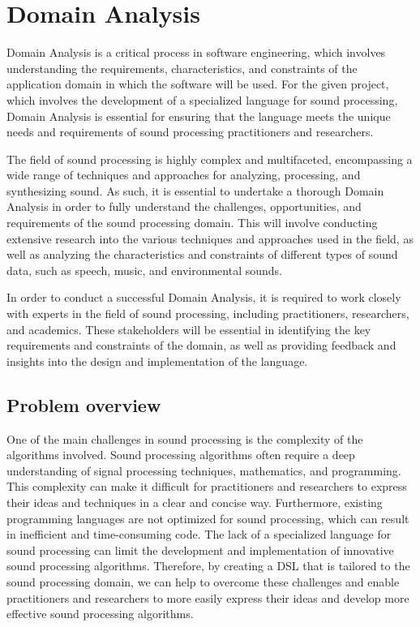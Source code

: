 \chapter{Domain Analysis}

Domain Analysis is a critical process in software engineering, which involves understanding the requirements, characteristics, and constraints of the application domain in which the software will be used. For the given project, which involves the development of a specialized language for sound processing, Domain Analysis is essential for ensuring that the language meets the unique needs and requirements of sound processing practitioners and researchers.

The field of sound processing is highly complex and multifaceted, encompassing a wide range of techniques and approaches for analyzing, processing, and synthesizing sound. As such, it is essential to undertake a thorough Domain Analysis in order to fully understand the challenges, opportunities, and requirements of the sound processing domain. This will involve conducting extensive research into the various techniques and approaches used in the field, as well as analyzing the characteristics and constraints of different types of sound data, such as speech, music, and environmental sounds.

In order to conduct a successful Domain Analysis, it is required to work closely with experts in the field of sound processing, including practitioners, researchers, and academics. These stakeholders will be essential in identifying the key requirements and constraints of the domain, as well as providing feedback and insights into the design and implementation of the language.

\section{Problem overview} 
One of the main challenges in sound processing is the complexity of the algorithms involved. Sound processing algorithms often require a deep understanding of signal processing techniques, mathematics, and programming. This complexity can make it difficult for practitioners and researchers to express their ideas and techniques in a clear and concise way. Furthermore, existing programming languages are not optimized for sound processing, which can result in inefficient and time-consuming code. The lack of a specialized language for sound processing can limit the development and implementation of innovative sound processing algorithms. Therefore, by creating a DSL that is tailored to the sound processing domain, we can help to overcome these challenges and enable practitioners and researchers to more easily express their ideas and develop more effective sound processing algorithms.

